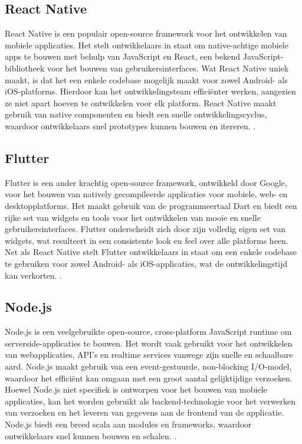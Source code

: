     \subsection{React Native}

    React Native is een populair open-source framework voor het ontwikkelen van mobiele applicaties. 
    Het stelt ontwikkelaars in staat om native-achtige mobiele apps te bouwen met behulp van JavaScript en React, een bekend JavaScript-bibliotheek voor het bouwen van gebruikersinterfaces. 
    Wat React Native uniek maakt, is dat het een enkele codebase mogelijk maakt voor zowel Android- als iOS-platforms. Hierdoor kan het ontwikkelingsteam efficiënter werken, 
    aangezien ze niet apart hoeven te ontwikkelen voor elk platform. React Native maakt gebruik van native componenten en biedt een snelle ontwikkelingscyclus, 
    waardoor ontwikkelaars snel prototypes kunnen bouwen en itereren. \autocite{react_native_docs}.

    \subsection{Flutter}
    
    Flutter is een ander krachtig open-source framework, ontwikkeld door Google, voor het bouwen van natively gecompileerde applicaties voor mobiele, web- en desktopplatforms. 
    Het maakt gebruik van de programmeertaal Dart en biedt een rijke set van widgets en tools voor het ontwikkelen van mooie en snelle gebruikersinterfaces. 
    Flutter onderscheidt zich door zijn volledig eigen set van widgets, wat resulteert in een consistente look en feel over alle platforms heen. 
    Net als React Native stelt Flutter ontwikkelaars in staat om een enkele codebase te gebruiken voor zowel Android- als iOS-applicaties, wat de ontwikkelingstijd kan verkorten. \autocite{flutter_docs}.

    \subsection{Node.js}
    
    Node.js is een veelgebruikte open-source, cross-platform JavaScript runtime om serverside-applicaties te bouwen. 
    Het wordt vaak gebruikt voor het ontwikkelen van webapplicaties, API's en realtime services vanwege zijn snelle en schaalbare aard. Node.js maakt gebruik van een event-gestuurde, 
    non-blocking I/O-model, waardoor het efficiënt kan omgaan met een groot aantal gelijktijdige verzoeken. Hoewel Node.js niet specifiek is ontworpen voor het bouwen van mobiele applicaties, 
    kan het worden gebruikt als backend-technologie voor het verwerken van verzoeken en het leveren van gegevens aan de frontend van de applicatie. Node.js biedt een breed scala aan modules en frameworks, 
    waardoor ontwikkelaars snel kunnen bouwen en schalen. \autocite{nodejs_docs}.

